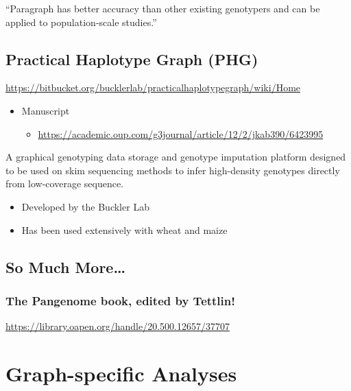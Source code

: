 \documentclass[
]{book}
\providecommand{\tightlist}{%
  \setlength{\itemsep}{0pt}\setlength{\parskip}{0pt}}
\begin{document}
``Paragraph has better accuracy than other existing genotypers and can be applied to population-scale studies.''

\hypertarget{practical-haplotype-graph-phg}{%
\section{Practical Haplotype Graph (PHG)}\label{practical-haplotype-graph-phg}}

\url{https://bitbucket.org/bucklerlab/practicalhaplotypegraph/wiki/Home}

\begin{itemize}
\tightlist
\item
  Manuscript

  \begin{itemize}
  \tightlist
  \item
    \url{https://academic.oup.com/g3journal/article/12/2/jkab390/6423995}
  \end{itemize}
\end{itemize}

A graphical genotyping data storage and genotype imputation platform designed to be used on skim sequencing methods to infer high-density genotypes directly from low-coverage sequence.

\begin{itemize}
\tightlist
\item
  Developed by the Buckler Lab
\item
  Has been used extensively with wheat and maize
\end{itemize}

\hypertarget{so-much-more}{%
\section{So Much More\ldots{}}\label{so-much-more}}

\hypertarget{the-pangenome-book-edited-by-tettlin}{%
\subsection{The Pangenome book, edited by Tettlin!}\label{the-pangenome-book-edited-by-tettlin}}

\url{https://library.oapen.org/handle/20.500.12657/37707}

\hypertarget{graph-specific-analyses}{%
\chapter{Graph-specific Analyses}\label{graph-specific-analyses}}
\end{document}
